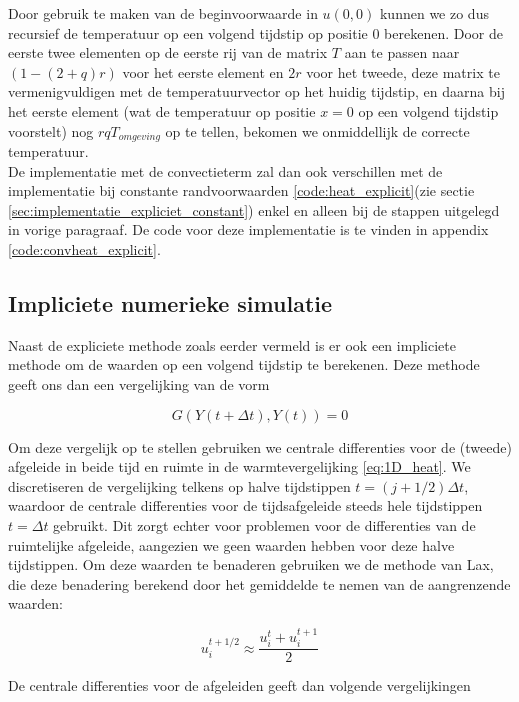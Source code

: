 \documentclass[a4paper,kulak]{kulakarticle} %
\begin{document}
Door gebruik te maken van de beginvoorwaarde in $u(0, 0)$ kunnen we zo dus recursief de temperatuur op een volgend tijdstip op positie 0 berekenen. Door de eerste twee elementen op de eerste rij van de matrix $T$ aan te passen naar $(1 - (2 + q)r)$ voor het eerste element en $2r$ voor het tweede, deze matrix te vermenigvuldigen met de temperatuurvector op het huidig tijdstip, en daarna bij het eerste element (wat de temperatuur op positie $x = 0$ op een volgend tijdstip voorstelt) nog $r q T_{omgeving}$ op te tellen, bekomen we onmiddellijk de correcte temperatuur. \\
De implementatie met de convectieterm zal dan ook verschillen met de implementatie bij constante randvoorwaarden \ref{code:heat_explicit}(zie sectie \ref{sec:implementatie_expliciet_constant}) enkel en alleen bij de stappen uitgelegd in vorige paragraaf. De code voor deze implementatie is te vinden in appendix \ref{code:convheat_explicit}.

\subsection{Impliciete numerieke simulatie}

Naast de expliciete methode zoals eerder vermeld is er ook een impliciete methode om de waarden op een volgend tijdstip te berekenen. Deze methode geeft ons dan een vergelijking van de vorm

\begin{equation*}
	G(Y(t + \Delta t), Y(t)) = 0
\end{equation*}

Om deze vergelijk op te stellen gebruiken we centrale differenties voor de (tweede) afgeleide in beide tijd en ruimte in de warmtevergelijking \ref{eq:1D_heat}. We discretiseren de vergelijking telkens op halve tijdstippen $t = (j + 1/2) \Delta t$, waardoor de centrale differenties voor de tijdsafgeleide steeds hele tijdstippen $t = \Delta t$ gebruikt. Dit zorgt echter voor problemen voor de differenties van de ruimtelijke afgeleide, aangezien we geen waarden hebben voor deze halve tijdstippen. Om deze waarden te benaderen gebruiken we de methode van Lax, die deze benadering berekend door het gemiddelde te nemen van de aangrenzende waarden:

\begin{equation}
	u_i^{t + 1/2} \approx \frac{u_i^t + u_i^{t + 1}}{2}
	\label{eq:lax_method}
\end{equation}

De centrale differenties voor de afgeleiden geeft dan volgende vergelijkingen
\end{document}
